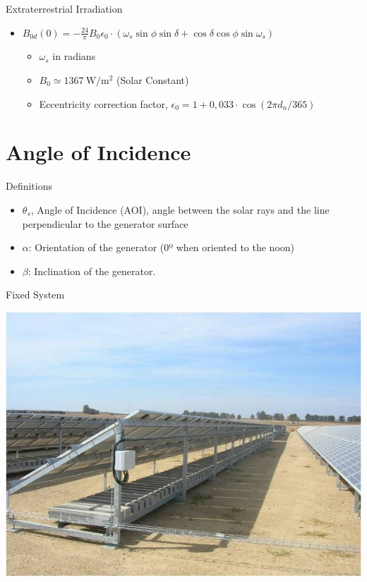 \documentclass[xcolor={usenames,svgnames,dvipsnames}]{beamer}
\begin{document}
\begin{frame}[label={sec:orgc78168c}]{Extraterrestrial Irradiation}
\begin{itemize}
\item \(B_{0d}(0)=-\frac{24}{\pi}B_{0}\epsilon_{0}\cdot(\omega_{s}\sin\phi\sin\delta+\cos\delta\cos\phi\sin\omega_{s})\)
\begin{itemize}
\item \(\omega_{s}\) in radians
\item \(B_0 \simeq \SI{1367}{\watt\per\meter\squared}\) (Solar Constant)
\item Eccentricity correction factor, \(\epsilon_0 = 1+0,033\cdot\cos(2\pi d_n/365)\)
\end{itemize}
\end{itemize}
\end{frame}

\section{Angle of Incidence}
\label{sec:orgb9e333a}
\begin{frame}[label={sec:orgc1741f8}]{Definitions}
\begin{itemize}
\item \(\theta_s\), Angle of Incidence (AOI), angle between the solar rays and the line perpendicular to the generator surface
\item \(\alpha\): Orientation of the generator (0º when oriented to the noon)
\item \(\beta\): Inclination of the generator.
\end{itemize}
\end{frame}

\begin{frame}[label={sec:orgd3dcf49}]{Fixed System}
\begin{center}
\includegraphics[width=.9\linewidth]{../figs/EstructuraEstaticaSuelo.jpg}
\end{center}
\end{frame}
\end{document}
